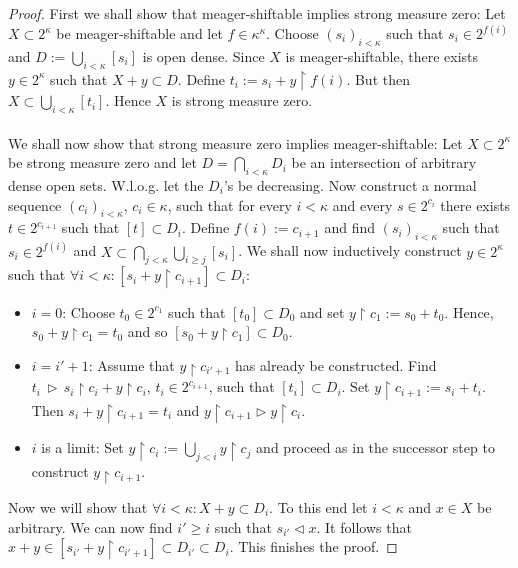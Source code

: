 \documentclass[12pt,a4paper]{scrartcl}
\theoremstyle{definition}
\numberwithin{equation}{section}
\begin{document}
\begin{proof}
First we shall show that meager-shiftable implies strong measure zero: Let $X \subset 2^\kappa$ be meager-shiftable and let $f \in \kappa^\kappa$. Choose $(s_i)_{i < \kappa}$ such that $s_i \in 2^{f(i)}$ and $D:= \bigcup_{i < \kappa} [s_i]$ is open dense. Since $X$ is meager-shiftable, there exists $y \in 2^\kappa$ such that $X+y \subset D$. Define $t_i:= s_i + y \restriction f(i)$. But then $X \subset \bigcup_{i< \kappa} [t_i]$. Hence $X$ is strong measure zero.\\
\\
We shall now show that strong measure zero implies meager-shiftable: Let $X \subset 2^\kappa$ be strong measure zero and let $D=\bigcap_{i<\kappa} D_i$ be an intersection of arbitrary dense open sets. W.l.o.g. let the $D_i$'s be decreasing. Now construct a normal sequence $(c_i)_{i<\kappa}$,  $c_i \in \kappa$, such that for every $i < \kappa$ and every $s \in 2^{c_i}$ there exists $t \in 2^{c_{i+1}}$ such that $[t] \subset D_i$. Define $f(i):=c_{i+1}$ and find $(s_i)_{i<\kappa}$ such that $s_i \in 2^{f(i)}$ and $X \subset \bigcap_{j< \kappa} \bigcup_{i\geq j} [s_i]$. We shall now inductively construct $y \in 2^\kappa$ such that $\forall i < \kappa \colon [s_i + y \restriction c_{i+1}] \subset D_i$:

\begin{itemize}
\item $i=0$: Choose $t_0 \in 2^{c_1}$ such that $[t_0] \subset D_0$ and set $y \restriction c_1:= s_0 + t_0$. Hence, $s_0 +y \restriction c_1 =t_0$ and so $[s_0 + y \restriction c_1] \subset D_0$.
\item $i=i'+1$: Assume that $y \restriction c_{i'+1}$ has already be constructed. Find $t_i \,  \triangleright \, s_i \restriction c_i + y \restriction c_i$, $t_i \in 2^{c_{i+1}}$, such that $[t_i] \subset D_i$. Set $y \restriction c_{i+1}:= s_i +t_i$. Then $s_i+ y \restriction c_{i+1} = t_i$ and $y \restriction c_{i+1} \triangleright y \restriction c_i$.
\item $i$ is a limit: Set $y \restriction c_i:= \bigcup_{j< i} y \restriction c_j$ and proceed as in the successor step to construct $y \restriction c_{i+1}$.
\end{itemize}
Now we will show that $ \forall i < \kappa \colon X+y \subset D_i$. To this end let $i < \kappa$ and $x \in X$ be arbitrary. We can now find $i' \geq i$ such that $s_{i'} \triangleleft x$. It follows that $x+y \in [s_{i'}+ y \restriction c_{i'+1}] \subset D_{i'} \subset D_i$. This finishes the proof.
\end{proof}
\end{document}
